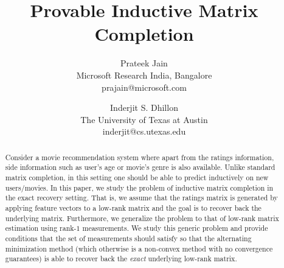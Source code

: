 \documentclass[11pt]{article}
\title{Provable Inductive Matrix Completion}
\author{Prateek Jain\\
{Microsoft Research India, Bangalore}\\
{prajain@microsoft.com}
\and
Inderjit S. Dhillon\\
{The University of Texas at Austin}\\
{inderjit@cs.utexas.edu}
}
\date{}
\begin{document}
\maketitle

\begin{abstract}
Consider a movie recommendation system where apart from the ratings information,  side information such as user's age or movie's genre is also available. Unlike  standard matrix completion, %
in this setting one should be able to predict inductively on new users/movies.  In this paper, we study the problem of inductive matrix completion in the exact recovery setting. That is, we assume that the ratings matrix is generated by applying feature vectors to a low-rank matrix and the goal is to recover back the underlying matrix. Furthermore, we generalize the problem to that of low-rank matrix estimation using rank-$1$ measurements. We study this generic problem and provide conditions that the set of measurements should satisfy so that the alternating minimization method (which otherwise is a non-convex method with no convergence guarantees) is able to recover back the {\em exact} underlying low-rank matrix. 


\end{abstract}
\end{document}
